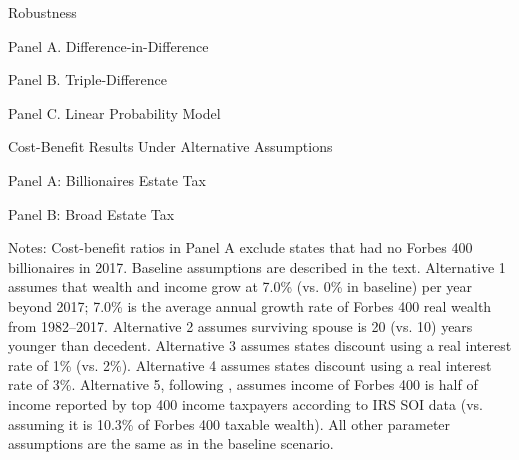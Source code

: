 \documentclass[12pt]{article}
\begin{document}
\clearpage


\begin{table}
\centering
	\caption{Robustness}
	\caption*{Panel A. Difference-in-Difference}
	\scalebox{0.8} {
		\renewenvironment{table}[1][]{\ignorespaces}{\unskip}
		
	}
	
	\caption*{Panel B. Triple-Difference}
	\scalebox{0.8} {
		\renewenvironment{table}[1][]{\ignorespaces}{\unskip}
		
	}

	\caption*{Panel C. Linear Probability Model}
	\scalebox{0.8} {
		\renewenvironment{table}[1][]{\ignorespaces}{\unskip}
		
	}
\label{tab:RestrictedSamples}
\end{table}

\clearpage

\begin{table}
	\centering
	\caption{Cost-Benefit Results Under Alternative Assumptions}
	\caption*{Panel A: Billionaires Estate Tax}
	\scalebox{0.9} {
		\renewenvironment{table}[1][]{\ignorespaces}{\unskip}
		
		\unskip
	}
	\vspace{10pt}
	\caption*{Panel B: Broad Estate Tax}
	\scalebox{0.9} {
		\renewenvironment{table}[1][]{\ignorespaces}{\unskip}
		
		\unskip
	}
\label{tab:CBrobustness}
\end{table}

{\footnotesize \noindent Notes: Cost-benefit ratios in Panel A exclude states that had no Forbes 400 billionaires in 2017. Baseline assumptions are described in the text. Alternative 1 assumes that wealth and income grow at 7.0\% (vs. 0\% in baseline) per year beyond 2017; 7.0\% is the average annual growth rate of Forbes 400 real wealth from 1982--2017. Alternative 2 assumes surviving spouse is 20 (vs. 10) years younger than decedent. Alternative 3 assumes states discount using a real interest rate of 1\% (vs. 2\%). Alternative 4 assumes states discount using a real interest rate of 3\%. Alternative 5, following \cite{saez-zucman:2019}, assumes income of Forbes 400 is half of income reported by top 400 income taxpayers according to IRS SOI data (vs. assuming it is 10.3\% of Forbes 400 taxable wealth). All other parameter assumptions are the same as in the baseline scenario.}

\clearpage
\end{document}
